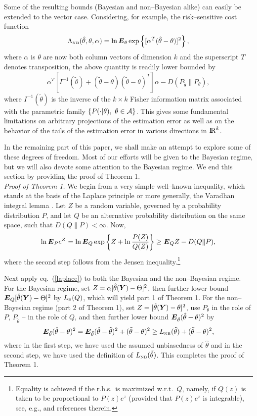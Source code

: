 \documentclass[11pt,epsf]{article}
\newcommand{\ttt}{\tilde{\theta}}
\newcommand{\ct}{\hat{\theta}}
\newcommand {\reals} {{\rm I\!R}}
\newcommand {\bE} {\mbox{\boldmath $E$}}
\newcommand {\bY} {\mbox{\boldmath $Y$}}
\newcommand{\calA}{{\cal A}}
\begin{document}
Some of the resulting bounds (Bayesian and non--Bayesian alike) can
easily be extended to the vector case.
Considering, for example, the risk--sensitive cost function
\begin{equation}
\Lambda_{\mbox{\tiny NB}}(\ct,\theta,\alpha)=\ln\bE_\theta\exp\left\{
[\alpha^T(\ct-\theta)]^2\right\},
\end{equation}
where $\alpha$ is $\theta$ are now both column vectors of dimension $k$ and
the superscript $T$ denotes transposition, the above quantity is readily lower bounded
by
\begin{equation}
\alpha^T[I^{-1}(\ttt)+(\ttt-\theta)(\ttt-\theta)^T]\alpha-D(P_{\ttt}\|P_\theta),
\end{equation}
where $I^{-1}(\ttt)$ is the inverse of the $k\times k$ Fisher information matrix
associated with the parametric family $\{P(\cdot|\theta),~\theta\in\calA\}$.
This gives some fundamental limitations on arbitrary projections of the
estimation error as well as on the behavior of the tails of the estimation
error in various directions in $\reals^k$.

In the remaining part of this paper, we shall make an attempt to explore some of these degrees of
freedom. Most of our efforts will be given to the Bayesian regime, but we
will also devote some attention to the Bayesian regime.
We end this section by providing the proof of Theorem 1.\\

\noindent
{\it Proof of Theorem 1.}
We begin from a very simple well--known inequality, which stands at the basis
of the Laplace principle \cite{DE97} or more generally, the Varadhan integral
lemma \cite[Section 4.3]{DZ93}. 
Let $Z$ be a random variable, governed by a probability distribution $P$,
and let $Q$ be an alternative probability distribution on the same space, such
that $D(Q\|P) < \infty$. Now,
\begin{equation}
\label{laplace}
\ln\bE_P e^Z=\ln \bE_Q \exp\left\{Z+\ln\frac{P(Z)}{Q(Z)}\right\}\ge \bE_Q
Z-D(Q\|P),
\end{equation}
where the second step follows from the Jensen inequality.\footnote{Equality is
achieved if the r.h.s.\ is maximized w.r.t.\ $Q$, namely, if $Q(z)$ is taken to be
proportional to $P(z)e^z$ (provided that $P(z)e^z$ is integrable), 
see, e.g., \cite{p143} and references therein.}

Next apply eq.\ (\ref{laplace}) to both the Bayesian and the non--Bayesian
regime. For the Bayesian regime, set
$Z=\alpha[\ct(\bY)-\Theta]^2$, then further lower bound $\bE_Q[\ct(\bY)-\Theta]^2$
by $L_{\mbox{\tiny B}}(Q)$, which will yield part 1 of Theorem 1.
For the non--Bayesian regime 
(part 2 of Theorem
1), set $Z=[\ct(\bY)-\theta]^2$, 
use $P_\theta$ in the role of $P$, $P_{\ttt}$ -- in the role of $Q$, and
then further lower bound $\bE_{\ttt}(\ct-\theta)^2$ by
\begin{equation}
\bE_{\ttt}(\ct-\theta)^2=\bE_{\ttt}(\ct-\ttt)^2+(\ttt-\theta)^2\ge
L_{\mbox{\tiny NB}}(\ttt)+(\ttt-\theta)^2,
\end{equation}
where in the first step, we have used the assumed unbiasedness 
of $\ct$ and in the second step, we have used the definition of
$L_{\mbox{\tiny NB}}(\ttt)$. This completes the proof of Theorem 1.
\end{document}
